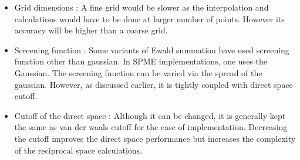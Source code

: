 \documentclass[9pt,bestpractices]{livecoms}
\begin{document}
\begin{itemize}
\item Grid dimensions : A fine grid would be slower as the interpolation and calculations would have to be done at larger number of points. However its accuracy will be higher than a coarse grid.
\item Screening function : Some variants of Ewald summation have used screening function other than  gaussian. In SPME implementations, one uses the Gaussian. The screening function can be varied via the spread of the gaussian.  However, as discussed earlier, it is tightly coupled with direct space cutoff.
\item Cutoff of the direct space : Although it can be changed, it is generally kept the same as van der waals cutoff for the ease of implementation. Decreasing the cutoff improves the direct space performance but increases the complexity of the reciprocal space calculations. 
\end{itemize}




\end{document}
